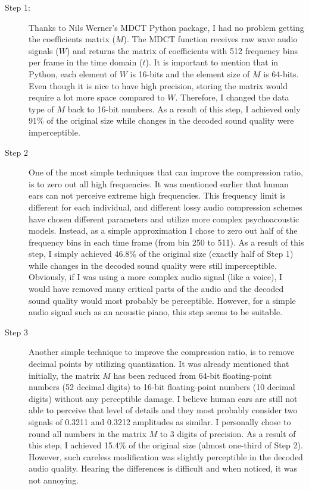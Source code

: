 \begin{description}
    \item[Step 1:] Thanks to Nils Werner's MDCT Python package\cite{werner2020mdct}, I had no problem getting the coefficients matrix ($M$). The MDCT function receives raw wave audio signals ($W$) and returns the matrix of coefficients with 512 frequency bins per frame in the time domain ($t$). It is important to mention that in Python, each element of $W$ is 16-bits and the element size of $M$ is 64-bits. Even though it is nice to have high precision, storing the matrix would require a lot more space compared to $W$. Therefore, I changed the data type of $M$ back to 16-bit numbers. As a result of this step, I achieved only 91\% of the original size while changes in the decoded sound quality were imperceptible.
    
    \item[Step 2] One of the most simple techniques that can improve the compression ratio, is to zero out all high frequencies. It was mentioned earlier that human ears can not perceive extreme high frequencies. This frequency limit is different for each individual, and different lossy audio compression schemes have chosen different parameters and utilize more complex psychoacoustic models. Instead, as a simple approximation I chose to zero out half of the frequency bins in each time frame (from bin 250 to 511). As a result of this step, I simply achieved 46.8\% of the original size (exactly half of Step 1) while changes in the decoded sound quality were still imperceptible. Obviously, if I was using a more complex audio signal (like a voice), I would have removed many critical parts of the audio and the decoded sound quality would most probably be perceptible. However, for a simple audio signal such as an acoustic piano, this step seems to be suitable.
    
    \item[Step 3] Another simple technique to improve the compression ratio, is to remove decimal points by utilizing  quantization. It was already mentioned that initially, the matrix $M$ has been reduced from 64-bit floating-point numbers (52 decimal digits) to 16-bit floating-point numbers (10 decimal digits) without any perceptible damage. I believe human ears are still not able to perceive that level of details and they most probably consider two signals of 0.3211 and 0.3212 amplitudes as similar. I personally chose to round all numbers in the matrix $M$ to 3 digits of precision. As a result of this step, I achieved 15.4\% of the original size (almost one-third of Step 2). However, such careless modification was slightly perceptible in the decoded audio quality. Hearing the differences is difficult and when noticed, it was not annoying.
    

\end{description}
